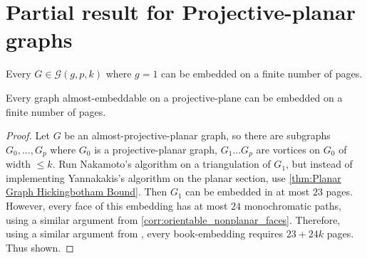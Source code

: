 
\section{Partial result for Projective-planar graphs}

\begin{theorem}
	Every $G \in \mathcal{G}(g, p, k)$ where $g = 1$ can be embedded on a finite number of pages.
\end{theorem}

\begin{theorem}
	Every graph almost-embeddable on a projective-plane can be embedded on a finite number of pages. 
\end{theorem}

\begin{proof}
	Let $G$ be an almost-projective-planar graph, so there are subgraphs $G_0, ..., G_p$ where $G_0$ is a projective-planar graph, $G_1 ... G_p$ are vortices on $G_0$ of width $\leq k$. 
	Run Nakamoto's algorithm on a triangulation of $G_1$, but instead of implementing Yannakakis's algorithm on the planar section, use \cref{thm:Planar Graph Hickingbotham Bound}. Then $G_1$ can be embedded in at most $23$ pages. However, every face of this embedding has at most $24$ monochromatic paths, using a similar argument from \cref{corr:orientable_nonplanar_faces}. Therefore, using a similar argument from \label{lem:orientablesurfaces_monochromatic_edges}, every book-embedding requires $23 + 24k$ pages. Thus shown. 
\end{proof}